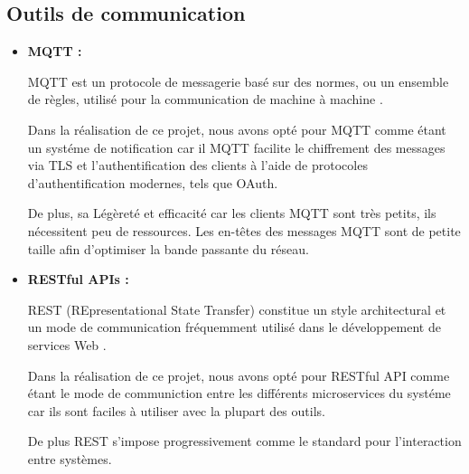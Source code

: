 \subsection{Outils de communication}
\begin{itemize}
    \item\textbf{MQTT : }
                \par MQTT est un protocole de messagerie basé sur des normes, ou un ensemble de règles, utilisé pour la communication de machine à machine \cite{mqtt}. 
                \par Dans la réalisation de ce projet, nous avons opté pour MQTT comme étant un systéme de notification car il MQTT facilite le chiffrement des messages 
                via TLS et l'authentification des clients à l'aide de protocoles d'authentification modernes, tels que OAuth. 
                \par De plus, sa Légèreté et efficacité car les clients MQTT sont très petits, ils nécessitent peu de ressources. Les en-têtes des messages MQTT sont de petite taille afin d'optimiser la bande passante du réseau.

    \item\textbf{RESTful APIs :}
    
            \par REST (REpresentational State Transfer) constitue un style architectural et un mode de communication fréquemment utilisé dans le développement de services Web \cite{rest}. 
            \par Dans la réalisation de ce projet, nous avons opté pour RESTful API comme étant le mode de communiction entre les différents microservices du systéme car ils sont faciles à utiliser avec la plupart des outils. 
            \par De plus REST s'impose progressivement comme le standard pour l'interaction entre systèmes. 

    \end{itemize}
